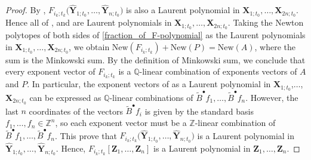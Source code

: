 \documentclass[pdftex]{sigma}
\numberwithin{equation}{section}
\begin{document}
\begin{proof}
 By \cite[Theorem 3.1]{BCDX2023}, $F_{i_{k};t_{k}}\bigl(\mathbf{\hat{Y}}_{1;t_{0}},\dots,\mathbf{\hat{Y}}_{n;t_{0}}\bigr)$ is also a Laurent polynomial in $\mathbf{X}_{1;t_{0}},\dots,\mathbf{X}_{2n;t_{0}}$. Hence all of ,  and  are Laurent polynomials in $\mathbf{X}_{1;t_{0}},\dots,\mathbf{X}_{2n;t_{0}}$. Taking the Newton polytopes of both sides of \eqref{fraction_of_F-polynomial} as the Laurent polynomials in $\mathbf{X}_{1;t_0},\dots, \mathbf{X}_{2n;t_0}$, we obtain
$\text{New}(F_{i_{k};t_{k}})+\text{New}(P)=\text{New}(A)$,
 where the sum is the Minkowski sum. By the definition of Minkowski sum, we conclude that every exponent vector of $F_{i_{k};t_{k}}$ is a $\mathbb{Q}$-linear combination of exponents vectors of $A$ and $P$.
 In particular, the exponent vectors of
  as a Laurent polynomial in $\mathbf{X}_{1;t_0}$,$\dots$, $\mathbf{X}_{2n;t_0}$ can be expressed as $\mathbb{Q}$-linear combinations of $\tilde{B}^{\bullet}f_{1},\dots,\tilde{B}^{\bullet}f_{n}$. However, the last $n$ coordinates of the vectors $\tilde{B}^{\bullet}f_{i}$ is given by the standard basis $f_1,\dots, f_{n}\in\mathbb{Z}^{n}$, so each exponent vector must be a $\mathbb{Z}$-linear combination of $\tilde{B}^{\bullet}f_{1},\dots,\tilde{B}^{\bullet}f_{n}$. This prove that $F_{i_{k};t_{k}}\bigl(\mathbf{\hat{Y}}_{1;t_{0}},\dots,\mathbf{\hat{Y}}_{n;t_{0}}\bigr)$ is a Laurent polynomial in $\mathbf{\hat{Y}}_{1;t_{0}},\dots,\mathbf{\hat{Y}}_{n;t_{0}}$. Hence, $F_{i_k;t_k}[\mathbf{Z}_1,\dots, \mathbf{Z}_n]$ is a Laurent polynomial in $\mathbf{Z}_{1},\dots,\mathbf{Z}_{n}$.


\end{proof}
\end{document}
